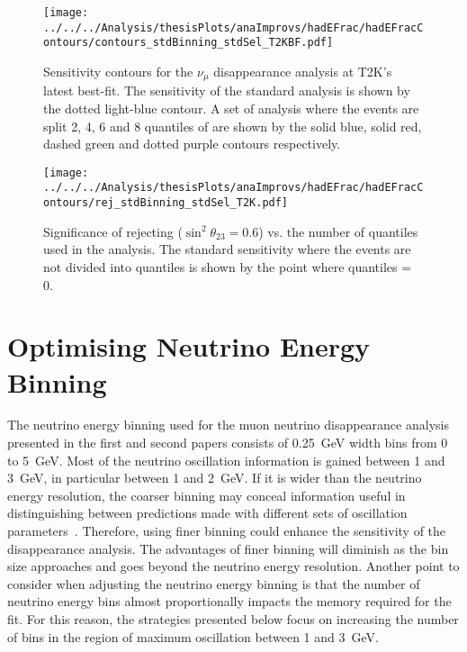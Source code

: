 \begin{figure}
  \centering
\texttt{[image: ../../../Analysis/thesisPlots/anaImprovs/hadEFrac/hadEFracContours/contours\_stdBinning\_stdSel\_T2KBF.pdf]}
  \caption{Sensitivity contours for the $\nu_\mu$ disappearance analysis at
    T2K's latest best-fit. The sensitivity of the standard
    analysis is shown by the dotted light-blue contour. A set of analysis
    where the events are split 2, 4, 6 and 8 quantiles of \hadefrac{}
    are shown by the solid blue, solid red, dashed green and dotted 
    purple contours respectively.} 
  \label{fig:hadEFracContour_T2K}
\end{figure}

\begin{figure}
  \centering
  \texttt{[image: ../../../Analysis/thesisPlots/anaImprovs/hadEFrac/hadEFracContours/rej\_stdBinning\_stdSel\_T2K.pdf]}
  \caption{Significance of rejecting ($\sin^2\theta_{23} = 0.6$)
    vs. the number of \hadefrac{} quantiles used in the
    analysis. 
    The standard sensitivity where the events are not
    divided into quantiles is shown by the point where quantiles = 0.    
  } 
  \label{fig:hadEFracRej_T2K}
\end{figure}




\section{Optimising Neutrino Energy Binning}

The neutrino energy binning used for the muon neutrino
disappearance analysis presented in the first and second papers
consists of 0.25~GeV width bins from 0 to 5~GeV. 
Most of the neutrino oscillation information is gained between 1 and
3~GeV, in particular between 1 and 2~GeV. 
If it is wider than the neutrino energy resolution, the coarser
binning may conceal information useful in distinguishing 
between predictions made with different sets of oscillation
parameters~\cite{Marshall}. 
Therefore, using finer binning could enhance the sensitivity of the
disappearance analysis.  
The advantages of finer binning will diminish as the bin size
approaches and goes beyond the neutrino energy resolution.
Another point to consider when adjusting the neutrino energy binning
is that the number of neutrino energy bins almost
proportionally impacts the memory required for the fit. 
For this reason, the strategies presented below focus on increasing
the number of bins in the region of maximum oscillation between 1 and
3~GeV.


